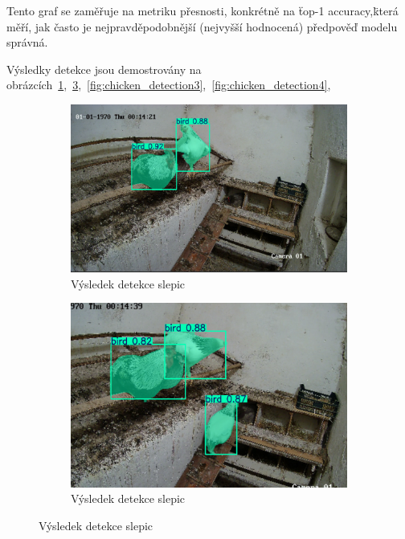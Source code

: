 Tento graf se zaměřuje na metriku přesnosti, konkrétně na \"top-1 accuracy,\" která měří, jak často je nejpravděpodobnější (nejvyšší hodnocená) předpověď modelu správná.

Výsledky detekce jsou demostrovány na obrázcích~\ref{fig:chicken_detection1},~\ref{fig:chicken_detection2},~\ref{fig:chicken_detection3},~\ref{fig:chicken_detection4},

\begin{figure}[h]
    \centering

    \begin{subfigure}[t]{1\textwidth}
        \centering
        \includegraphics[width=\textwidth]{img/chicken_detection1}
        \caption{Výsledek detekce slepic}
        \label{fig:chicken_detection1}
    \end{subfigure}

    \begin{subfigure}[t]{1\textwidth}
        \centering
        \includegraphics[width=\textwidth]{img/chicken_detection2}
        \caption{Výsledek detekce slepic}
        \label{fig:chicken_detection2}
    \end{subfigure}


\end{figure}
